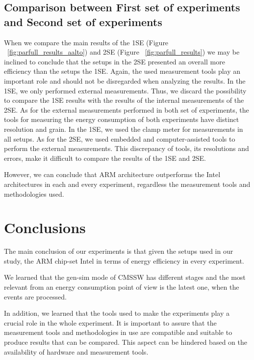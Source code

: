 \subsection*{Comparison between First set of experiments and Second set of experiments}

When we compare the main results of the 1SE (Figure ~\ref{fig:parfull_results_aalto}) and 2SE (Figure ~\ref{fig:parfull_results}) we may be inclined to conclude that the setups in the 2SE presented an overall more efficiency than the setups the 1SE. Again, the used measurement tools play an important role and should not be disregarded when analyzing the results. 
In the 1SE, we only performed external measurements. Thus, we discard the possibility to compare the 1SE results with the results of the internal measurements of the 2SE. 
As for the external measurements performed in both set of experiments, the tools for measuring the energy consumption of both experiments have distinct resolution and grain. In the 1SE, we used the clamp meter for measurements in all setups. As for the 2SE, we used embedded and computer-assisted tools to perform the external measurements. This discrepancy of tools, its resolutions and errors, make it difficult to compare the results of the 1SE and 2SE.

However, we can conclude that ARM architecture outperforms the Intel architectures in each and every experiment, regardless the measurement tools and methodologies used.

\section{Conclusions}
The main conclusion of our experiments is that given the setups used in our study, the ARM chip-set Intel in terms of energy efficiency in every experiment.

We learned that the gen-sim mode of CMSSW has different stages and the most relevant from an energy consumption point of view is the latest one, when the events are processed.


In addition, we learned that the tools used to make the experiments play a crucial role in the whole experiment. It is important to assure that the measurement tools and methodologies in use are compatible and suitable to produce results that can be compared. This aspect can be hindered based on the availability of hardware and measurement tools. 
